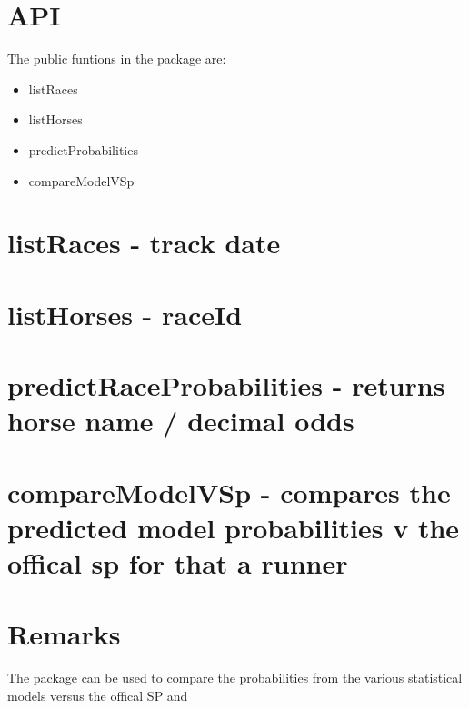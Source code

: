 \documentclass[11pt,]{article}
\begin{document}
\section{API}\label{api}

The public funtions in the package are:

\begin{itemize}
\item
  listRaces
\item
  listHorses
\item
  predictProbabilities
\item
  compareModelVSp
\end{itemize}

\section{listRaces - track date}\label{listraces---track-date}

\section{listHorses - raceId}\label{listhorses---raceid}

\section{predictRaceProbabilities - returns horse name / decimal
odds}\label{predictraceprobabilities---returns-horse-name-decimal-odds}

\section{compareModelVSp - compares the predicted model probabilities v
the offical sp for that a
runner}\label{comparemodelvsp---compares-the-predicted-model-probabilities-v-the-offical-sp-for-that-a-runner}

\section{Remarks}\label{remarks}

The package can be used to compare the probabilities from the various
statistical models versus the offical SP and

\newpage
\singlespacing 
\end{document}

